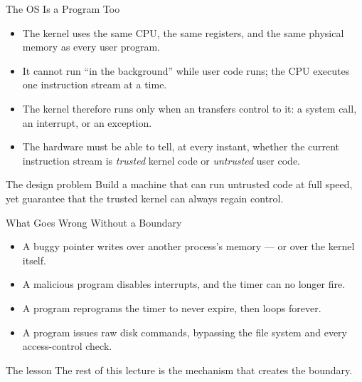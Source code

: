 \documentclass[aspectratio=169]{beamer}
\begin{document}

\begin{frame}{The OS Is a Program Too}
  \begin{itemize}
    \item The kernel uses the same CPU, the same registers, and the same
      physical memory as every user program.
    \item It cannot run ``in the background'' while user code runs; the CPU
      executes one instruction stream at a time.
    \item The kernel therefore runs only when an  transfers control
      to it: a system call, an interrupt, or an exception.
    \item The hardware must be able to tell, at every instant, whether the
      current instruction stream is \emph{trusted} kernel code or
      \emph{untrusted} user code.
  \end{itemize}
  \vspace{0.2cm}
  \begin{block}{The design problem}
    Build a machine that can run untrusted code at full speed, yet guarantee
    that the trusted kernel can always regain control.
  \end{block}
\end{frame}

\begin{frame}{What Goes Wrong Without a Boundary}
  \begin{itemize}
    \item A buggy pointer writes over another process's memory --- or over the
      kernel itself.
    \item A malicious program disables interrupts, and the timer can no longer
      fire.
    \item A program reprograms the timer to never expire, then loops forever.
    \item A program issues raw disk commands, bypassing the file system and
      every access-control check.
  \end{itemize}
  \vspace{0.2cm}
  \begin{alertblock}{The lesson}
    The rest of this lecture is the mechanism that creates the boundary.
  \end{alertblock}
\end{frame}
\end{document}
